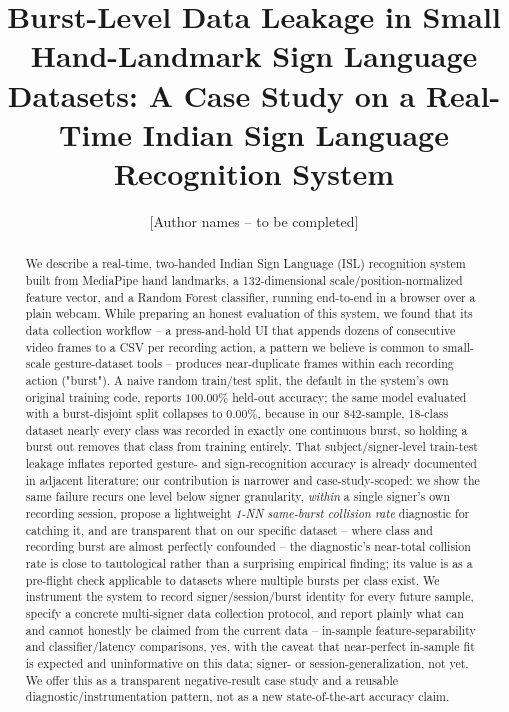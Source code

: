 \documentclass[runningheads]{llncs}
\begin{document}
\title{Burst-Level Data Leakage in Small Hand-Landmark Sign Language
Datasets: A Case Study on a Real-Time Indian Sign Language Recognition System}

\author{[Author names -- to be completed]}

\maketitle

\begin{abstract}
We describe a real-time, two-handed Indian Sign Language (ISL) recognition
system built from MediaPipe hand landmarks, a 132-dimensional
scale/position-normalized feature vector, and a Random Forest classifier,
running end-to-end in a browser over a plain webcam. While preparing an
honest evaluation of this system, we found that its data collection
workflow -- a press-and-hold UI that appends dozens of consecutive video
frames to a CSV per recording action, a pattern we believe is common to
small-scale gesture-dataset tools -- produces near-duplicate frames within
each recording action ("burst"). A naive random train/test split, the
default in the system's own original training code, reports $100.00\%$
held-out accuracy; the same model evaluated with a burst-disjoint split
collapses to $0.00\%$, because in our 842-sample, 18-class dataset nearly
every class was recorded in exactly one continuous burst, so holding a
burst out removes that class from training entirely. That subject/signer-level
train-test leakage inflates reported gesture- and sign-recognition
accuracy is already documented in adjacent literature; our contribution is
narrower and case-study-scoped: we show the same failure recurs one level
below signer granularity, \emph{within} a single signer's own recording
session, propose a lightweight \emph{1-NN same-burst collision rate}
diagnostic for catching it, and are transparent that on our specific
dataset -- where class and recording burst are almost perfectly
confounded -- the diagnostic's near-total collision rate is close to
tautological rather than a surprising empirical finding; its value is as
a pre-flight check applicable to datasets where multiple bursts per class
exist. We instrument the system to record signer/session/burst identity
for every future sample, specify a concrete multi-signer data collection
protocol, and report plainly what can and cannot honestly be claimed from
the current data -- in-sample feature-separability and classifier/latency
comparisons, yes, with the caveat that near-perfect in-sample fit is
expected and uninformative on this data; signer- or session-generalization,
not yet. We offer this as a transparent negative-result case study and a
reusable diagnostic/instrumentation pattern, not as a new
state-of-the-art accuracy claim.

\end{abstract}
\end{document}
